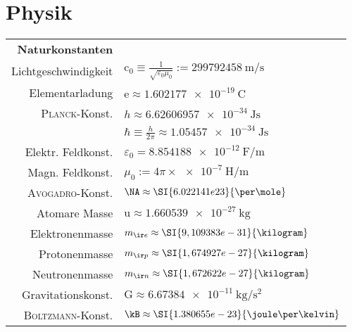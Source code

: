 \documentclass[color,german]{latex4ei/latex4ei_sheet}
\begin{document}
\section{Physik}


\begin{symbolbox}
	\renewcommand{\arraystretch}{1.5}
	\begin{tabular}{rl}
		\textbf{Naturkonstanten} & \\ \mrule
		Lichtgeschwindigkeit & $\mathrm{c}_0 \equiv \frac{1}{\sqrt{\varepsilon_0 \mu_0}} := \SI{299 792 458}{\meter\per\second}$\\
		Elementarladung & $\mathrm{e}  \approx \SI{1.602 177e-19}{\coulomb}$\\
		\textsc{Planck}-Konst. & $h \approx \SI{6,626 069 57e-34}{\joule\second}$\\
			& $\hbar \equiv \frac{h}{2 \pi} \approx \SI{1.05457e-34}{\joule\second}$ \\
		Elektr. Feldkonst. & $\varepsilon_0 = \SI{8.854 188e-12}{\farad\per\meter}$\\		%
		Magn. Feldkonst. & $\mu_0 := 4\pi \times \SI{e-7}{\henry\per\meter}$\\
		\textsc{Avogadro}-Konst. & $\NA \approx \SI{6.022 141e23}{\per\mole}$\\
		Atomare Masse & $\mathrm{u} \approx \SI{1.660 539e-27}{\kilogram}$\\
		Elektronenmasse & $m_{\ir e} \approx \SI{9,109 383e-31}{\kilogram}$\\
		Protonenmasse & $m_{\ir p} \approx \SI{1,674 927e-27}{\kilogram}$\\
		Neutronenmasse & $m_{\ir n} \approx \SI{1,672 622e-27}{\kilogram}$\\
		Gravitationskonst. & $\mathrm{G} \approx \SI{6,673 84e-11}{\kilogram\per\second\squared}$\\
		\textsc{Boltzmann}-Konst. & $\kB \approx \SI{1.380 655e-23}{\joule\per\kelvin}$\\
	\end{tabular}
\end{symbolbox}
\end{document}
